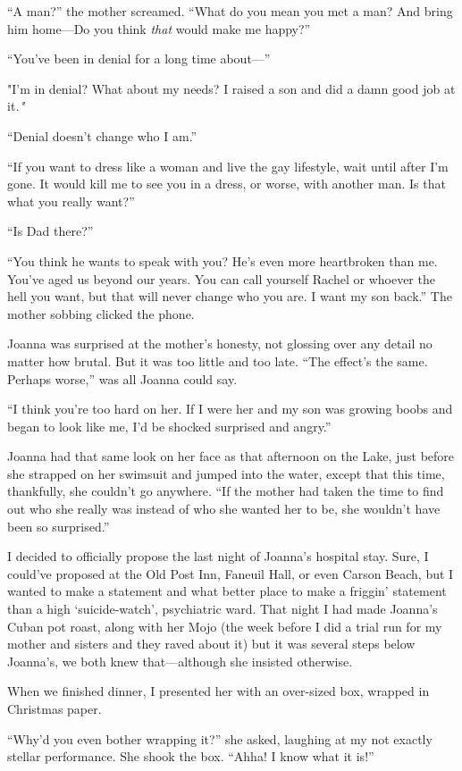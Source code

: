 ``A man?'' the mother screamed. ``What do you mean you met a man? And
bring him home---Do you think \emph{that} would make me happy?''

``You've been in denial for a long time about---''

"I'm in denial? What about my needs? I raised a son and did a damn good
job at it\emph{."}

``Denial doesn't change who I am.''

``If you want to dress like a woman and live the gay lifestyle, wait
until after I'm gone. It would kill me to see you in a dress, or worse,
with another man. Is that what you really want?''

``Is Dad there?''

``You think he wants to speak with you? He's even more heartbroken than
me. You've aged us beyond our years. You can call yourself Rachel or
whoever the hell you want, but that will never change who you are. I
want my son back.'' The mother sobbing clicked the phone.

Joanna was surprised at the mother's honesty, not glossing over any
detail no matter how brutal. But it was too little and too late. ``The
effect's the same. Perhaps worse,'' was all Joanna could say.

``I think you're too hard on her. If I were her and my son was growing
boobs and began to look like me, I'd be shocked surprised and angry.''

Joanna had that same look on her face as that afternoon on the Lake,
just before she strapped on her swimsuit and jumped into the water,
except that this time, thankfully, she couldn't go anywhere. ``If the
mother had taken the time to find out who she really was instead of who
she wanted her to be, she wouldn't have been so surprised.''

I decided to officially propose the last night of Joanna's hospital
stay. Sure, I could've proposed at the Old Post Inn, Faneuil Hall, or
even Carson Beach, but I wanted to make a statement and what better
place to make a friggin' statement than a high `suicide-watch',
psychiatric ward. That night I had made Joanna's Cuban pot roast, along
with her Mojo (the week before I did a trial run for my mother and
sisters and they raved about it) but it was several steps below
Joanna's, we both knew that---although she insisted otherwise.

When we finished dinner, I presented her with an over-sized box, wrapped
in Christmas paper.

``Why'd you even bother wrapping it?'' she asked, laughing at my not
exactly stellar performance. She shook the box. ``Ahha! I know what it
is!''

